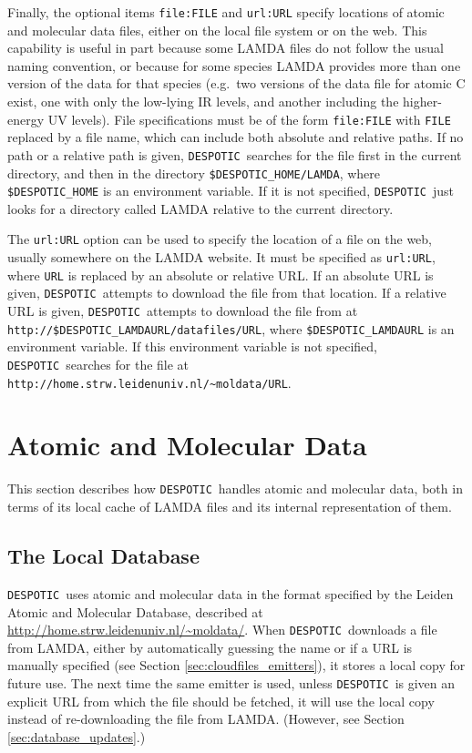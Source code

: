 \documentclass[12pt]{article}
\newcommand{\despotic}{\texttt{DESPOTIC}}
\begin{document}
Finally, the optional items \verb=file:FILE= and \verb=url:URL= specify locations of atomic and molecular data files, either on the local file system or on the web. This capability is useful in part because some LAMDA files do not follow the usual naming convention, or because for some species LAMDA provides more than one version of the data for that species (e.g.~two versions of the data file for atomic C exist, one with only the low-lying IR levels, and another including the higher-energy UV levels). File specifications must be of the form \verb=file:FILE= with \verb=FILE= replaced by a file name, which can include both absolute and relative paths. If no path or a relative path is given, \despotic\ searches for the file first in the current directory, and then in the directory \verb=$DESPOTIC_HOME/LAMDA=, where \verb=$DESPOTIC_HOME= is an environment variable. If it is not specified, \despotic\ just looks for a directory called LAMDA relative to the current directory.

The \verb=url:URL= option can be used to specify the location of a file on the web, usually somewhere on the LAMDA website. It must be specified as \verb=url:URL=, where \verb=URL= is replaced by an absolute or relative URL. If an absolute URL is given, \despotic\ attempts to download the file from that location. If a relative URL is given, \despotic\ attempts to download the file from at \verb=http://$DESPOTIC_LAMDAURL/datafiles/URL=, where \verb=$DESPOTIC_LAMDAURL= is an environment variable. If this environment variable is not specified, \despotic\ searches for the file at \verb=http://home.strw.leidenuniv.nl/~moldata/URL=.

\clearpage

\section{Atomic and Molecular Data}
\label{sec:lamda}

This section describes how \despotic\ handles atomic and molecular data, both in terms of its local cache of LAMDA files and its internal representation of them.

\subsection{The Local Database}

\despotic\ uses atomic and molecular data in the format specified by the Leiden Atomic and Molecular Database, described at \url{http://home.strw.leidenuniv.nl/~moldata/}. When \despotic\ downloads a file from LAMDA, either by automatically guessing the name or if a URL is manually specified (see Section \ref{sec:cloudfiles_emitters}), it stores a local copy for future use. The next time the same emitter is used, unless \despotic\ is given an explicit URL from which the file should be fetched, it will use the local copy instead of re-downloading the file from LAMDA. (However, see Section \ref{sec:database_updates}.)
\end{document}
